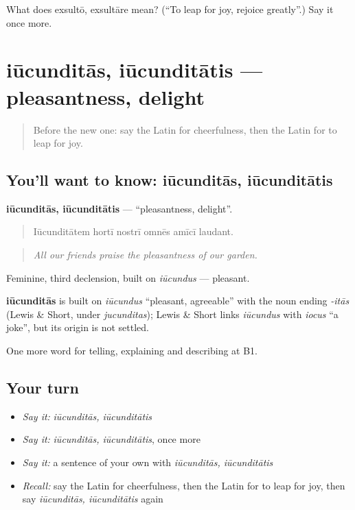\begin{tcolorbox}[breakable,colback=teal!4,colframe=teal!35!black,title={Before you move on}]
What does exsultō, exsultāre mean? (\textquotedblleft{}To leap for joy, rejoice greatly\textquotedblright{}.) Say it once more.
\end{tcolorbox}
\section[iūcunditās, iūcunditātis]{iūcunditās, iūcunditātis — pleasantness, delight}

\label{lesson:LA-C489-iucunditas}



\begin{quote}
Before the new one: say the Latin for cheerfulness, then the Latin for to leap for joy.
\end{quote}

\subsection*{You'll want to know: iūcunditās, iūcunditātis}
\textbf{iūcunditās, iūcunditātis} — \textquotedblleft{}pleasantness, delight\textquotedblright{}.

\begin{quote}
Iūcunditātem hortī nostrī omnēs amīcī laudant.
\end{quote}

\begin{quote}
\emph{All our friends praise the pleasantness of our garden.}
\end{quote}

Feminine, third declension, built on \emph{iūcundus} — pleasant.

\begin{cousinweb}
\textbf{iūcunditās} is built on \emph{iūcundus} \textquotedblleft{}pleasant, agreeable\textquotedblright{} with the noun ending \emph{-itās} (Lewis \& Short, under \emph{jucunditas}); Lewis \& Short links \emph{iūcundus} with \emph{iocus} \textquotedblleft{}a joke\textquotedblright{}, but its origin is not settled.
\end{cousinweb}

\begin{grammarlens}[title={What you've built}]
One more word for telling, explaining and describing at B1.
\end{grammarlens}

\subsection*{Your turn}
\begin{itemize}
\raggedright
  \item \emph{Say it:} \emph{iūcunditās, iūcunditātis}
  \item \emph{Say it:} \emph{iūcunditās, iūcunditātis}, once more
  \item \emph{Say it:} a sentence of your own with \emph{iūcunditās, iūcunditātis}
  \item \emph{Recall:} say the Latin for cheerfulness, then the Latin for to leap for joy, then say \emph{iūcunditās, iūcunditātis} again
\end{itemize}

